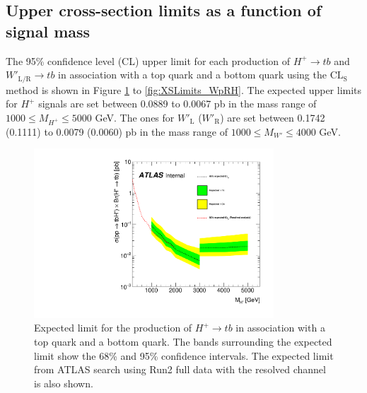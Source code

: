 \subsection{Upper cross-section limits as a function of signal mass}
\label{subsec:Upperlimits}
The 95\% confidence level (CL) upper limit for each production of $H^{+}{\rightarrow}tb$ and $W'_{\text{L/R}}{\rightarrow}tb$ in association with a top quark and a bottom quark using the $\text{CL}_{\text{S}}$ method is shown in Figure \ref{fig:XSLimits_Hp} to \ref{fig:XSLimits_WpRH}. The expected upper limits for $H^{+}$ signals are set between 0.0889 to 0.0067 pb in the mass range of $1000 \leq M_{H^{+}} \leq 5000$ GeV. The ones for $W'_{\text{L}}$ ($W'_{\text{R}}$) are set between 0.1742 (0.1111) to 0.0079 (0.0060) pb in the mass range of $1000 \leq M_{W'} \leq 4000$ GeV.

\begin{figure}[H]
  \centering
  \includegraphics[width=0.8\textwidth]{images/ProfileLHFit/XSUpperLimits_Hp.pdf}
  \caption{Expected limit for the production of $H^{+}{\rightarrow}tb$ in association with a top quark and a bottom quark. The bands surrounding the expected limit show the 68\% and 95\% confidence intervals. The expected limit from ATLAS search using Run2 full data with the resolved channel is also shown\cite{HDBS-2021-02}.}
  \label{fig:XSLimits_Hp}
\end{figure}

